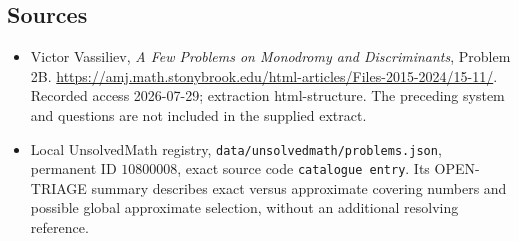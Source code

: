 \documentclass[11pt]{article}
\begin{document}
\subsection{Sources}
\begin{itemize}
\item Victor Vassiliev, \emph{A Few Problems on Monodromy and Discriminants}, Problem 2B. \url{https://amj.math.stonybrook.edu/html-articles/Files-2015-2024/15-11/}. Recorded access 2026-07-29; extraction html-structure. The preceding system and questions are not included in the supplied extract.
\item Local UnsolvedMath registry, \texttt{data/unsolvedmath/problems.json}, permanent ID \(10800008\), exact source code \texttt{catalogue entry}. Its OPEN-TRIAGE summary describes exact versus approximate covering numbers and possible global approximate selection, without an additional resolving reference.
\end{itemize}
\end{document}
